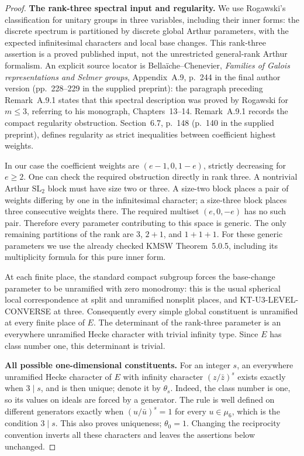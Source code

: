 \documentclass[11pt,a4paper]{article}
\theoremstyle{definition}
\renewcommand{\paragraph}[1]{\par\smallskip\noindent\textbf{#1}\quad\ignorespaces}
\begin{document}
\begin{proof}
\paragraph{The rank-three spectral input and regularity.}
We use Rogawski's classification for unitary groups in three variables,
including their inner forms: the discrete spectrum is partitioned by
discrete global Arthur parameters, with the expected infinitesimal
characters and local base changes. This rank-three assertion is a
proved published input, not the unrestricted general-rank Arthur
formalism. An explicit source locator is Bella\"iche--Chenevier,
\emph{Families of Galois representations and Selmer groups},
Appendix~A.9, p.~244 in the final author version
(pp.~228--229 in the supplied preprint): the paragraph
preceding Remark~A.9.1 states that this spectral description was proved
by Rogawski for $m\le3$, referring to his monograph, Chapters~13--14.
Remark~A.9.1 records the compact regularity obstruction. Section~6.7,
p.~148 (p.~140 in the supplied preprint), defines regularity as strict inequalities between coefficient
highest weights.

In our case the coefficient weights are $(e-1,0,1-e)$, strictly
decreasing for $e\ge2$. One can check the required obstruction directly
in rank three. A nontrivial Arthur $\mathrm{SL}_2$ block must have size
two or three. A size-two block places a pair of weights differing by
one in the infinitesimal character; a size-three block places three
consecutive weights there. The required multiset $(e,0,-e)$ has no
such pair. Therefore every parameter contributing to this space is
generic. The only remaining partitions of the rank are $3$, $2+1$,
and $1+1+1$. For these generic parameters we use the already checked
KMSW Theorem~5.0.5, including its multiplicity formula for this pure
inner form.

At each finite place, the standard compact subgroup forces the
base-change parameter to be unramified with zero monodromy:
this is the usual spherical local correspondence at split and
unramified nonsplit places, and KT-U3-LEVEL-CONVERSE at three.
Consequently every simple global constituent is unramified at every
finite place of $E$. The determinant of the rank-three parameter is
an everywhere unramified Hecke character with trivial infinity type.
Since $E$ has class number one, this determinant is trivial.

\paragraph{All possible one-dimensional constituents.}
For an integer $s$, an everywhere unramified Hecke character of $E$
with infinity character $(z/\bar z)^s$ exists exactly when $3\mid s$,
and is then unique; denote it by $\theta_s$.
Indeed, the class number is one, so its values on ideals are forced
by a generator. The rule is well defined on different generators
exactly when $(u/\bar u)^s=1$ for every $u\in\mu_6$, which is the
condition $3\mid s$. This also proves uniqueness; $\theta_0=1$.
Changing the reciprocity convention inverts all these characters
and leaves the assertions below unchanged.


\end{proof}
\end{document}

